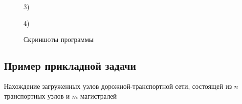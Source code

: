 \begin{figure}[H]
\begin{minipage}[h]{0.47\linewidth}
\end{minipage}
\vfill
\begin{minipage}[h]{0.47\linewidth}
 3) \\
\end{minipage}
\hfill
\begin{minipage}[h]{0.47\linewidth}
 4) \\
\end{minipage}
\caption{Скриншоты программы}
\label{ris:experimentalcorrelationsignals}
\end{figure}
\newpage
\subsection{Пример прикладной задачи}
Нахождение загруженных узлов дорожной-транспортной сети, состоящей из $n$ транспортных узлов и $m$ магистралей




